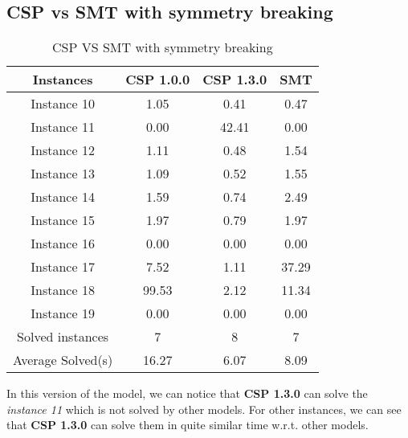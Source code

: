 \subsection{CSP vs SMT with symmetry breaking}
\begin{table}[!h]
    \centering
    \begin{tabular}{|c|c|c|c|}\hline
        Instances               & CSP 1.0.0  & CSP 1.3.0   & SMT    \\ \hline
        Instance 10             & 1.05   & 0.41    & 0.47   \\ \hline
        Instance 11             & 0.00   & 42.41  & 0.00   \\ \hline
        Instance 12             & 1.11   & 0.48    & 1.54   \\ \hline
        Instance 13             & 1.09   & 0.52    & 1.55   \\ \hline
        Instance 14             & 1.59   & 0.74    & 2.49   \\ \hline
        Instance 15             & 1.97   & 0.79    & 1.97   \\ \hline
        Instance 16             & 0.00   & 0.00  & 0.00   \\ \hline
        Instance 17             & 7.52   & 1.11    & 37.29  \\ \hline
        Instance 18             & 99.53   & 2.12   & 11.34  \\ \hline
        Instance 19             & 0.00   & 0.00    & 0.00   \\ \hline
        Solved   instances      & 7      & 8       & 7      \\ \hline
        Average   Solved(s)        & 16.27   & 6.07   & 8.09   \\ \hline
    \end{tabular}
    \caption{CSP VS SMT with symmetry breaking}
    \label{tab:csp-smt-with-symm-comparison}
\end{table}
In this version of the model, we can notice that \textbf{CSP 1.3.0} can solve the \textit{instance 11} which is not solved by other models. For other instances, we can see that \textbf{CSP 1.3.0} can solve them in quite similar time w.r.t. other models.\\




